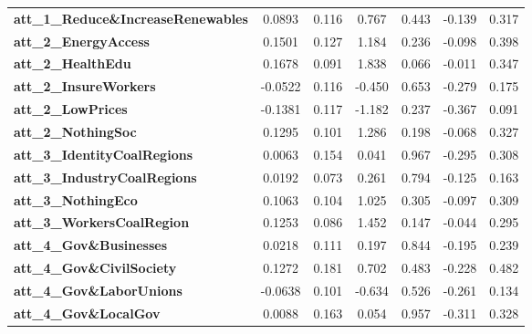 \begin{center}
\begin{tabular}{lcccccc}
\textbf{att\_1\_Reduce\&IncreaseRenewables} &       0.0893  &        0.116     &     0.767  &         0.443        &       -0.139    &        0.317     \\
\textbf{att\_2\_EnergyAccess}               &       0.1501  &        0.127     &     1.184  &         0.236        &       -0.098    &        0.398     \\
\textbf{att\_2\_HealthEdu}                  &       0.1678  &        0.091     &     1.838  &         0.066        &       -0.011    &        0.347     \\
\textbf{att\_2\_InsureWorkers}              &      -0.0522  &        0.116     &    -0.450  &         0.653        &       -0.279    &        0.175     \\
\textbf{att\_2\_LowPrices}                  &      -0.1381  &        0.117     &    -1.182  &         0.237        &       -0.367    &        0.091     \\
\textbf{att\_2\_NothingSoc}                 &       0.1295  &        0.101     &     1.286  &         0.198        &       -0.068    &        0.327     \\
\textbf{att\_3\_IdentityCoalRegions}        &       0.0063  &        0.154     &     0.041  &         0.967        &       -0.295    &        0.308     \\
\textbf{att\_3\_IndustryCoalRegions}        &       0.0192  &        0.073     &     0.261  &         0.794        &       -0.125    &        0.163     \\
\textbf{att\_3\_NothingEco}                 &       0.1063  &        0.104     &     1.025  &         0.305        &       -0.097    &        0.309     \\
\textbf{att\_3\_WorkersCoalRegion}          &       0.1253  &        0.086     &     1.452  &         0.147        &       -0.044    &        0.295     \\
\textbf{att\_4\_Gov\&Businesses}            &       0.0218  &        0.111     &     0.197  &         0.844        &       -0.195    &        0.239     \\
\textbf{att\_4\_Gov\&CivilSociety}          &       0.1272  &        0.181     &     0.702  &         0.483        &       -0.228    &        0.482     \\
\textbf{att\_4\_Gov\&LaborUnions}           &      -0.0638  &        0.101     &    -0.634  &         0.526        &       -0.261    &        0.134     \\
\textbf{att\_4\_Gov\&LocalGov}              &       0.0088  &        0.163     &     0.054  &         0.957        &       -0.311    &        0.328     \\

\end{tabular}
\end{center}
